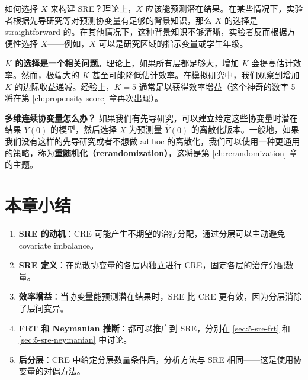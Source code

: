 如何选择 $X$ 来构建 SRE？理论上，$X$ 应该能预测潜在结果。在某些情况下，实验者根据先导研究等对预测协变量有足够的背景知识，那么 $X$ 的选择是 straightforward 的。在其他情况下，这种背景知识不够清晰，实验者反而根据方便性选择 $X$——例如，$X$ 可以是研究区域的指示变量或学生年级。

\textbf{$K$ 的选择是一个相关问题}。理论上，如果所有层都足够大，增加 $K$ 会提高估计效率。然而，极端大的 $K$ 甚至可能降低估计效率。在模拟研究中，我们观察到增加 $K$ 的边际收益递减。经验上，$K = 5$ 通常足以获得效率增益（这个神奇的数字 5 将在第 \ref{ch:propensity-score} 章再次出现）。

\textbf{多维连续协变量怎么办？} 如果我们有先导研究，可以建立给定这些协变量时潜在结果 $Y(0)$ 的模型，然后选择 $X$ 为预测量 $\hat Y(0)$ 的离散化版本。一般地，如果我们没有这样的先导研究或者不想做 ad hoc 的离散化，我们可以使用一种更通用的策略，称为\textbf{重随机化（rerandomization）}，这将是第 \ref{ch:rerandomization} 章的主题。

\section{本章小结}\label{sec:5-summary}

\begin{enumerate}
  \item \textbf{SRE 的动机}：CRE 可能产生不期望的治疗分配，通过分层可以主动避免 covariate imbalance。
  \item \textbf{SRE 定义}：在离散协变量的各层内独立进行 CRE，固定各层的治疗分配数量。
  \item \textbf{效率增益}：当协变量能预测潜在结果时，SRE 比 CRE 更有效，因为分层消除了层间变异。
  \item \textbf{FRT 和 Neymanian 推断}：都可以推广到 SRE，分别在 \cref{sec:5-sre-frt} 和 \cref{sec:5-sre-neymanian} 中讨论。
  \item \textbf{后分层}：CRE 中给定分层数量条件后，分析方法与 SRE 相同——这是使用协变量的对偶方法。
\end{enumerate}

\par{}
